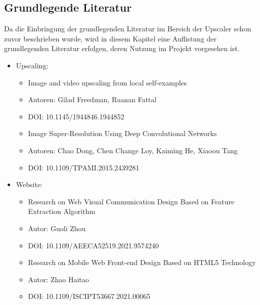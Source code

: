 \begin{onehalfspace}
	
\section{Grundlegende Literatur}

Da die Einbringung der grundlegenden Literatur im Bereich der Upscaler schon zuvor beschrieben wurde, wird in diesem Kapitel eine Auflistung der grundlegenden Literatur erfolgen, deren Nutzung im Projekt vorgesehen ist.

\begin{itemize}
	\item Upscaling:
	\begin{itemize}
		\item Image and video upscaling from local self-examples
		\item Autoren: Gilad Freedman, Raanan Fattal
		\item DOI: 10.1145/1944846.1944852
	\end{itemize}
	\begin{itemize}
		\item Image Super-Resolution Using Deep Convolutional Networks
		\item Autoren: 
		Chao Dong, Chen Change Loy, Kaiming He, Xiaoou Tang
		\item DOI: 10.1109/TPAMI.2015.2439281
	\end{itemize}
	\item Website:
	\begin{itemize}
		\item Research on Web Visual Communication Design Based on Feature Extraction Algorithm
		\item Autor: Guoli Zhou
		\item DOI:  10.1109/AEECA52519.2021.9574240
	\end{itemize}
	\begin{itemize}
		\item Research on Mobile Web Front-end Design Based on HTML5 Technology
		\item Autor: Zhao Haitao
		\item DOI:  10.1109/ISCIPT53667.2021.00065
	\end{itemize}
\end{itemize}

\end{onehalfspace}